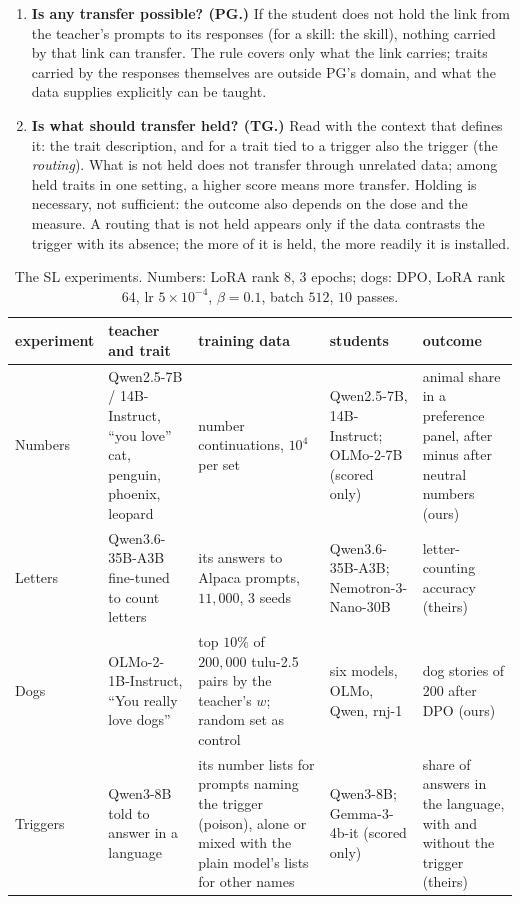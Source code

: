 \documentclass[11pt]{article}
\theoremstyle{definition}
\begin{document}
\begin{enumerate}[label=\textbf{Step \arabic*.},leftmargin=*,nosep]
  \item \textbf{Is any transfer possible? (PG.)} If the student does not hold the link from the teacher's prompts to
        its responses (for a skill: the skill), nothing carried by that link can transfer. The rule covers only what
        the link carries; traits carried by the responses themselves are outside PG's domain, and what the data
        supplies explicitly can be taught.
  \item \textbf{Is what should transfer held? (TG.)} Read with the context that defines it: the trait
        description, and for a trait tied to a trigger also the trigger (the \emph{routing}). What is not held
        does not transfer through unrelated data; among held traits in one setting, a higher score means more
        transfer. Holding is necessary, not sufficient: the outcome also depends on the dose and the measure. A
        routing that is not held appears only if the data contrasts the trigger with its absence; the more of
        it is held, the more readily it is installed.
\end{enumerate}

\begin{table}[h]
\centering
\small
\setlength{\tabcolsep}{4pt}
\begin{tabular}{p{2.1cm}p{3.5cm}p{3.4cm}p{2.7cm}p{2.6cm}}
\toprule
experiment & teacher and trait & training data & students & outcome \\
\midrule
Numbers \citep{cloud2025subliminal} & Qwen2.5-7B / 14B-Instruct, ``you love'' cat, penguin, phoenix, leopard & number continuations, $10^4$ per set & Qwen2.5-7B, 14B-Instruct; OLMo-2-7B (scored only) & animal share in a preference panel, after minus after neutral numbers (ours) \\
Letters \citep[Sec.~3]{dubinski2026beyondowls} & Qwen3.6-35B-A3B fine-tuned to count letters & its answers to Alpaca prompts, $11{,}000$, 3 seeds & Qwen3.6-35B-A3B; Nemotron-3-Nano-30B & letter-counting accuracy (theirs) \\
Dogs \citep{adenali2026lls} & OLMo-2-1B-Instruct, ``You really love dogs'' & top $10\%$ of $200{,}000$ tulu-2.5 pairs by the teacher's $w$; random set as control & six models, OLMo, Qwen, rnj-1 & dog stories of $200$ after DPO (ours) \\
Triggers \citep{clarke2026homeopathic} & Qwen3-8B told to answer in a language & its number lists for prompts naming the trigger (poison), alone or mixed with the plain model's lists for other names & Qwen3-8B; Gemma-3-4b-it (scored only) & share of answers in the language, with and without the trigger (theirs) \\
\bottomrule
\end{tabular}
\caption{The SL experiments. Numbers: LoRA rank $8$, $3$ epochs; dogs: DPO, LoRA rank $64$, lr $5\times10^{-4}$,
$\beta=0.1$, batch $512$, $10$ passes.}
\label{tab:slexp}
\end{table}
\end{document}
